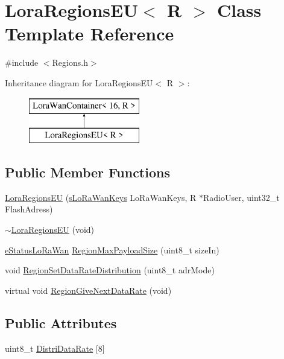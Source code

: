 \hypertarget{class_lora_regions_e_u}{}\section{Lora\+Regions\+EU$<$ R $>$ Class Template Reference}
\label{class_lora_regions_e_u}


{\ttfamily \#include $<$Regions.\+h$>$}

Inheritance diagram for Lora\+Regions\+EU$<$ R $>$\+:\begin{figure}[H]
\begin{center}
\leavevmode
\includegraphics[height=2.000000cm]{class_lora_regions_e_u}
\end{center}
\end{figure}
\subsection*{Public Member Functions}
\begin{DoxyCompactItemize}
\item 
\mbox{\hyperlink{class_lora_regions_e_u_ae819c451aa7c913b67386705ed993645}{Lora\+Regions\+EU}} (\mbox{\hyperlink{structs_lo_ra_wan_keys}{s\+Lo\+Ra\+Wan\+Keys}} Lo\+Ra\+Wan\+Keys, R $\ast$Radio\+User, uint32\+\_\+t Flash\+Adress)
\item 
\mbox{\hyperlink{class_lora_regions_e_u_a7b420653e64fa700d76181d561eb4ca9}{$\sim$\+Lora\+Regions\+EU}} (void)
\item 
\mbox{\hyperlink{_define_8h_a1cea710adbbf5b02bced8f79cd82f7b9}{e\+Status\+Lo\+Ra\+Wan}} \mbox{\hyperlink{class_lora_regions_e_u_aac8f3f20d2a79717a1c0d26f72e073ef}{Region\+Max\+Payload\+Size}} (uint8\+\_\+t size\+In)
\item 
void \mbox{\hyperlink{class_lora_regions_e_u_a94b24cf6b5b8059025cb4e12d03eb97f}{Region\+Set\+Data\+Rate\+Distribution}} (uint8\+\_\+t adr\+Mode)
\item 
virtual void \mbox{\hyperlink{class_lora_regions_e_u_a10897e9e39c1b1682596b9e55844724c}{Region\+Give\+Next\+Data\+Rate}} (void)
\end{DoxyCompactItemize}
\subsection*{Public Attributes}
\begin{DoxyCompactItemize}
\item 
uint8\+\_\+t \mbox{\hyperlink{class_lora_regions_e_u_a9a47972a842e40860f3fd6c2a8bd8847}{Distri\+Data\+Rate}} \mbox{[}8\mbox{]}
\end{DoxyCompactItemize}
